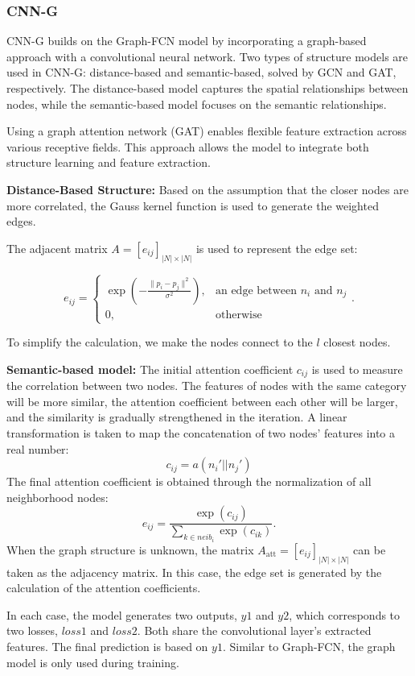 \subsubsection{CNN-G}

CNN-G builds on the Graph-FCN model by incorporating a graph-based approach with a convolutional neural network. Two types of structure models are used in CNN-G: distance-based and semantic-based, solved by GCN and GAT, respectively. The distance-based model captures the spatial relationships between nodes, while the semantic-based model focuses on the semantic relationships.

Using a graph attention network (GAT) enables flexible feature extraction across various receptive fields. This approach allows the model to integrate both structure learning and feature extraction.

\textbf{Distance-Based Structure:} Based on the assumption that the closer nodes are more correlated, the Gauss kernel function is used to generate the weighted edges.

The adjacent matrix $A = [e_{ij}]_{|N| \times |N|}$ is used to represent the edge set:

\[
e_{ij} = \begin{cases} \exp \left( -\frac{\|p_i - p_j\|^2}{\sigma^2} \right), & \text{an edge between } n_i \text{ and } n_j \\ 0, & \text{otherwise} \end{cases}.
\]

To simplify the calculation, we make the nodes connect to the $l$ closest nodes.

\textbf{Semantic-based model:} The initial attention coefficient $c_{ij}$ is used to measure the correlation between two nodes. The features of nodes with the same category will be more similar, the attention coefficient between each other will be larger, and the similarity is gradually strengthened in the iteration. A linear transformation is taken to map the concatenation of two nodes' features into a real number: 
\[
c_{ij} = a \left( n_i' || n_j' \right)
\]
The final attention coefficient is obtained through the normalization of all neighborhood nodes: 
\[
e_{ij} = \frac{\exp(c_{ij})}{\sum_{k \in neib_{i}} \exp(c_{ik})}.
\]
When the graph structure is unknown, the matrix $A_{\text{att}} = [e_{ij}]_{|N| \times |N|}$ can be taken as the adjacency matrix. In this case, the edge set is generated by the calculation of the attention coefficients.

In each case, the model generates two outputs, $y1$ and $y2$, which corresponds to two losses, $loss1$ and $loss2$. Both share the convolutional layer's extracted features. The final prediction is based on $y1$. Similar to Graph-FCN, the graph model is only used during training.

